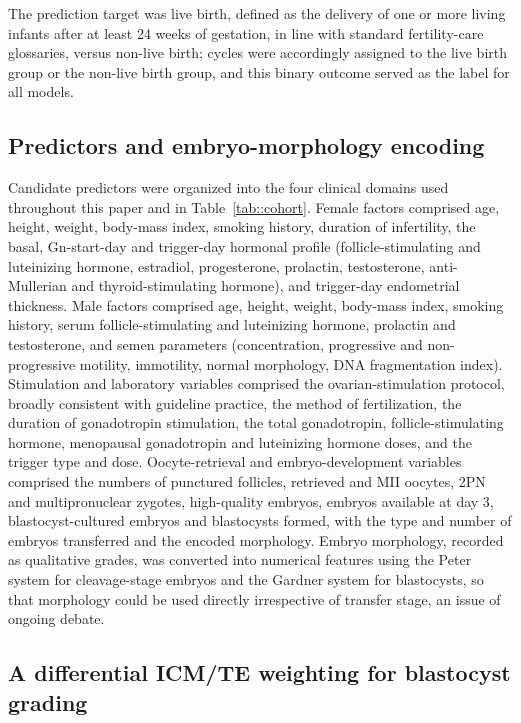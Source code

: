 \documentclass[12pt,a4paper]{article}
\begin{document}
The prediction target was live birth, defined as the delivery of one or more living infants after at least 24 weeks of gestation, in line with standard fertility-care glossaries,\cite{zegers} versus non-live birth; cycles were accordingly assigned to the live birth group or the non-live birth group, and this binary outcome served as the label for all models.

\subsection*{Predictors and embryo-morphology encoding}

Candidate predictors were organized into the four clinical domains used throughout this paper and in Table~\ref{tab::cohort}. Female factors comprised age, height, weight, body-mass index, smoking history, duration of infertility, the basal, Gn-start-day and trigger-day hormonal profile (follicle-stimulating and luteinizing hormone, estradiol, progesterone, prolactin, testosterone, anti-Mullerian and thyroid-stimulating hormone), and trigger-day endometrial thickness. Male factors comprised age, height, weight, body-mass index, smoking history, serum follicle-stimulating and luteinizing hormone, prolactin and testosterone, and semen parameters (concentration, progressive and non-progressive motility, immotility, normal morphology, DNA fragmentation index). Stimulation and laboratory variables comprised the ovarian-stimulation protocol, broadly consistent with guideline practice,\cite{eshreStim} the method of fertilization, the duration of gonadotropin stimulation, the total gonadotropin, follicle-stimulating hormone, menopausal gonadotropin and luteinizing hormone doses, and the trigger type and dose. Oocyte-retrieval and embryo-development variables comprised the numbers of punctured follicles, retrieved and MII oocytes, 2PN and multipronuclear zygotes, high-quality embryos, embryos available at day 3, blastocyst-cultured embryos and blastocysts formed, with the type and number of embryos transferred and the encoded morphology. Embryo morphology, recorded as qualitative grades, was converted into numerical features using the Peter system for cleavage-stage embryos and the Gardner system for blastocysts, so that morphology could be used directly irrespective of transfer stage, an issue of ongoing debate.\cite{glujovsky}

\subsection*{A differential ICM/TE weighting for blastocyst grading}
\end{document}
